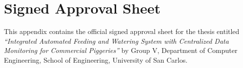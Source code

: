 \chapter{Signed Approval Sheet}
\label{appendix:approval}

This appendix contains the official signed approval sheet for the thesis entitled \textit{``Integrated Automated Feeding and Watering System with Centralized Data Monitoring for Commercial Piggeries''} by Group V, Department of Computer Engineering, School of Engineering, University of San Carlos.


